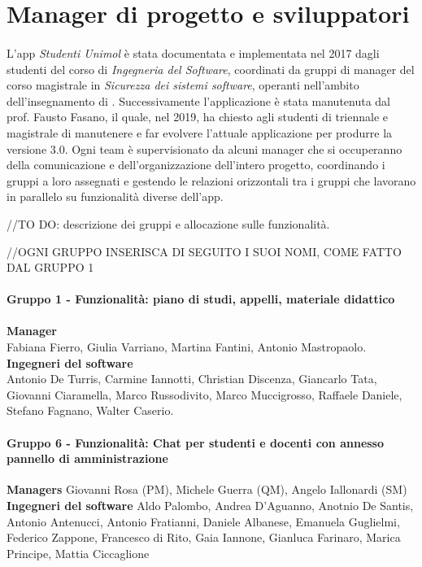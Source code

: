 \section{Manager di progetto e sviluppatori}

\paragraph{}
L'app \textit{Studenti Unimol} è stata documentata e implementata nel 2017 dagli studenti del corso di \textit{Ingegneria del Software}, coordinati da gruppi di manager del corso magistrale in \textit{Sicurezza dei sistemi software}, operanti nell'ambito dell'insegnamento di . Successivamente l'applicazione è stata manutenuta dal prof. Fausto Fasano, il quale, nel 2019, ha chiesto agli studenti di triennale e magistrale di manutenere e far evolvere l'attuale applicazione per produrre la versione 3.0. Ogni team è supervisionato da alcuni manager che si occuperanno della comunicazione e dell'organizzazione dell'intero progetto, coordinando i gruppi a loro assegnati e gestendo le relazioni orizzontali tra i gruppi che lavorano in parallelo su funzionalità diverse dell'app.

//TO DO: descrizione dei gruppi e allocazione sulle funzionalità.

//OGNI GRUPPO INSERISCA DI SEGUITO I SUOI NOMI, COME FATTO DAL GRUPPO 1 \\ \\
\textbf {Gruppo 1 - Funzionalità: piano di studi, appelli, materiale didattico} \\ \\
\textbf{Manager} \\
Fabiana Fierro, Giulia Varriano, Martina Fantini, Antonio Mastropaolo. \\
\textbf{Ingegneri del software} \\
Antonio De Turris, Carmine Iannotti, Christian Discenza, Giancarlo Tata, Giovanni Ciaramella, Marco Russodivito, Marco Muccigrosso, Raffaele Daniele, Stefano Fagnano, Walter Caserio.

\paragraph{Gruppo 6 - Funzionalità: Chat per studenti e docenti con annesso pannello di amministrazione\newline\newline} 
\textbf{Managers\newline} 
Giovanni Rosa (PM),
Michele Guerra (QM),
Angelo Iallonardi (SM)
\textbf{Ingegneri del software\newline}
Aldo Palombo,
Andrea D'Aguanno,
Anotnio De Santis,
Antonio Antenucci,
Antonio Fratianni,
Daniele Albanese,
Emanuela Guglielmi,
Federico Zappone,
Francesco di Rito,
Gaia Iannone,
Gianluca Farinaro, 
Marica Principe, 
Mattia Ciccaglione

